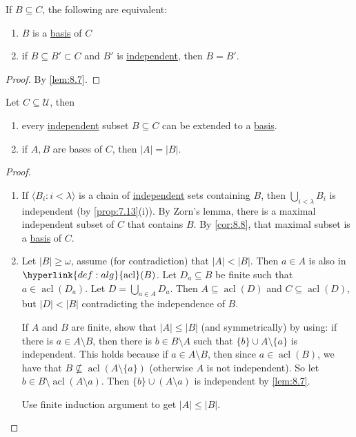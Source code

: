 \documentclass{article}
\DeclareMathOperator{\acl}{acl}
\newcommand{\named}[1]{\textbf{#1}\index{#1}}
\newcommand{\U}{\mathcal{U}}
\begin{document}
\begin{ncor}\label{cor:8.8}
  If $B \subseteq C$, the following are equivalent:
  \begin{enumerate}[label=(\roman*)]
    \item $B$ is a \hyperlink{def:basis}{basis} of $C$
    \item if $B \subseteq B' \subset C$ and $B'$ is \hyperlink{def:indep}{independent}, then $B = B'$.
  \end{enumerate}
\end{ncor}
\begin{proof}
  By \cref{lem:8.7}.
\end{proof}
\begin{nthm}\label{thm:8.9}
  Let $C \subseteq \U$, then
  \begin{enumerate}[label=(\roman*)]
    \item every \hyperlink{def:indep}{independent} subset $B \subseteq C$ can be extended to a \hyperlink{def:basis}{basis}.
    \item if $A,B$ are bases of $C$, then $|A| = |B|$.
  \end{enumerate}
\end{nthm}
\begin{proof}\leavevmode
  \begin{enumerate}[label=(\roman*)]
    \item If $\langle B_i : i < \lambda \rangle$ is a chain of \hyperlink{def:indep}{independent} sets containing $B$, then $\bigcup_{i < \lambda} B_i$ is independent (by \cref{prop:7.13}(i)).
      By Zorn's lemma, there is a maximal independent subset of $C$ that contains $B$. By \cref{cor:8.8}, that maximal subset is a \hyperlink{def:basis}{basis} of $C$.
    \item {}Let $|B| \geq \omega$, assume (for contradiction) that $|A| < |B|$.
      Then $a \in A$ is also in $\hyperlink{def:alg}{\acl}(B)$.
      Let $D_a \subseteq B$ be finite such that $a \in \acl(D_a)$. Let $D = \bigcup_{a \in A} D_a$.
      Then $A \subseteq \acl(D)$ and $C \subseteq \acl(D)$, but $|D| < |B|$ contradicting the independence of $B$.

      If $A$ and $B$ are finite, show that $|A| \leq |B|$  (and symmetrically) by using: if there is $a \in A \setminus B$, then there is $b \in B \setminus A$ such that $\{b\} \cup A \setminus \{a\}$ is independent.
      This holds because if $a \in A \setminus B$, then since $a \in \acl(B)$, we have that $B \nsubseteq \acl(A \setminus \{a\})$ (otherwise $A$ is not independent).
      So let $b \in B \setminus \acl(A \setminus a)$.
      Then $\{b\} \cup (A \setminus a)$ is independent by \cref{lem:8.7}.

      Use finite induction argument to get $|A| \leq |B|$. \qedhere
  \end{enumerate}
\end{proof}
\end{document}
